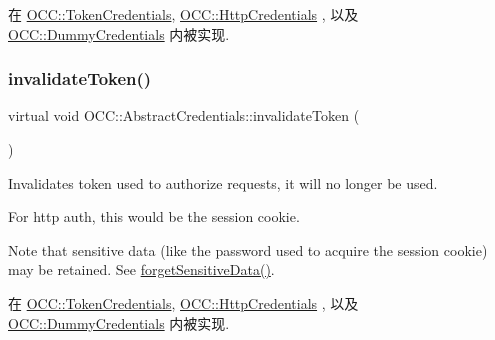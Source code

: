 在 \hyperlink{class_o_c_c_1_1_token_credentials_af5d6eb118b0d49adb6f6a2d572d157e6}{O\+C\+C\+::\+Token\+Credentials}, \hyperlink{class_o_c_c_1_1_http_credentials_ab35f0246f13eb9901a8d6a719db8046e}{O\+C\+C\+::\+Http\+Credentials} , 以及 \hyperlink{class_o_c_c_1_1_dummy_credentials_af8987175306059ae7beaff9e38b5c68d}{O\+C\+C\+::\+Dummy\+Credentials} 内被实现.

\mbox{\label{class_o_c_c_1_1_abstract_credentials_a9c5d9d0c3e4a8fc1ff8cf45efc2f0337}} 
\subsubsection{\texorpdfstring{invalidate\+Token()}{invalidateToken()}}
{\footnotesize\ttfamily virtual void O\+C\+C\+::\+Abstract\+Credentials\+::invalidate\+Token (\begin{DoxyParamCaption}{ }\end{DoxyParamCaption})\hspace{0.3cm}{\ttfamily [pure virtual]}}

Invalidates token used to authorize requests, it will no longer be used.

For http auth, this would be the session cookie.

Note that sensitive data (like the password used to acquire the session cookie) may be retained. See \hyperlink{class_o_c_c_1_1_abstract_credentials_af8f5afe21813bd54607713342fef8448}{forget\+Sensitive\+Data()}. 

在 \hyperlink{class_o_c_c_1_1_token_credentials_a8d2456b0fb01c7b69dece6a762dd16b5}{O\+C\+C\+::\+Token\+Credentials}, \hyperlink{class_o_c_c_1_1_http_credentials_a1ea63d4fa2bb42a61ce3bfde3332c754}{O\+C\+C\+::\+Http\+Credentials} , 以及 \hyperlink{class_o_c_c_1_1_dummy_credentials_a57c8037130e3c0b1729d7d89390a599b}{O\+C\+C\+::\+Dummy\+Credentials} 内被实现.

\mbox{\label{class_o_c_c_1_1_abstract_credentials_abc4722b371be047160cb18a416c85c74}} 
